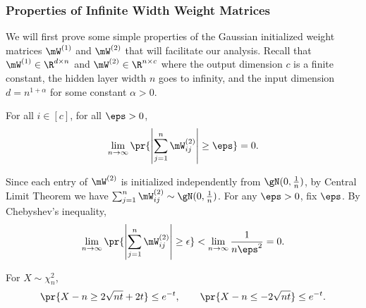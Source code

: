 \subsubsection{Properties of Infinite Width Weight Matrices}
\label{sec:pf-W-properties}
We will first prove some simple properties of the Gaussian initialized weight matrices $\mW^{(1)}$ and $\mW^{(2)}$ that will facilitate our analysis. Recall that $\mW^{(1)}\in\R^{d\times n}$ and $\mW^{(2)}\in\R^{n\times c}$ where the output dimension $c$ is a finite constant, the hidden layer width $n$ goes to infinity, and the input dimension $d=n^{1+\alpha}$ for some constant $\alpha>0$.
\begin{lemma}
\label{lemma:W-expectation}
 For all $i\in[c]$, for all $\eps>0$,
 \begin{equation}
    \lim_{n\to\infty}\pr{\left|\sum_{j=1}^n\mW_{ij}^{(2)}\right|\geq\eps}=0.
 \end{equation}
\end{lemma}
\begin{proofof}{}
Since each entry of $\mW^{(2)}$ is initialized independently from $\gN(0,\frac1n)$, by Central Limit Theorem we have $\sum_{j=1}^n\mW_{ij}^{(2)}\sim \gN(0,\frac{1}{n})$. For any $\eps > 0$, fix $\eps$. By Chebyshev's inequality,
\begin{equation}
    \lim_{n\to\infty}\pr{\left|\sum_{j=1}^n\mW^{(2)}_{ij}\right|\geq\epsilon} < \lim_{n\to\infty}\frac{1}{n\eps^2} = 0. 
\end{equation}
\end{proofof}

\begin{lemma}
\label{lemma:chi2-tail}\citep{laurent2000adaptive} For $X\sim\chi_n^2$,\begin{equation}
    \pr{X-n\geq 2\sqrt{nt}+2t}\leq e^{-t},\qquad \pr{X-n\leq -2\sqrt{nt}}\leq e^{-t}.
\end{equation}

\end{lemma}


